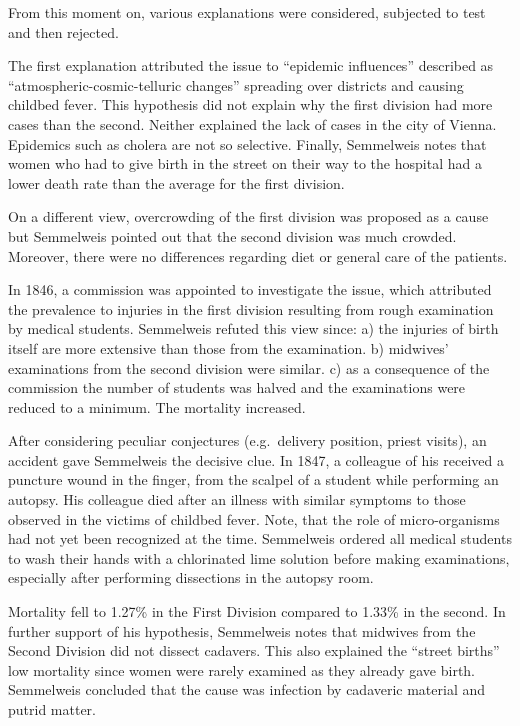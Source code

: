 \documentclass[
]{book}
\begin{document}
From this moment on, various explanations were considered, subjected to test and then rejected.

The first explanation attributed the issue to ``epidemic influences'' described as ``atmospheric-cosmic-telluric changes'' spreading over districts and causing childbed fever. This hypothesis did not explain why the first division had more cases than the second. Neither explained the lack of cases in the city of Vienna. Epidemics such as cholera are not so selective. Finally, Semmelweis notes that women who had to give birth in the street on their way to the hospital had a lower death rate than the average for the first division.

On a different view, overcrowding of the first division was proposed as a cause but Semmelweis pointed out that the second division was much crowded. Moreover, there were no differences regarding diet or general care of the patients.

In 1846, a commission was appointed to investigate the issue, which attributed the prevalence to injuries in the first division resulting from rough examination by medical students. Semmelweis refuted this view since: a) the injuries of birth itself are more extensive than those from the examination. b) midwives' examinations from the second division were similar. c) as a consequence of the commission the number of students was halved and the examinations were reduced to a minimum. The mortality increased.

After considering peculiar conjectures (e.g.~delivery position, priest visits), an accident gave Semmelweis the decisive clue. In 1847, a colleague of his received a puncture wound in the finger, from the scalpel of a student while performing an autopsy. His colleague died after an illness with similar symptoms to those observed in the victims of childbed fever. Note, that the role of micro-organisms had not yet been recognized at the time. Semmelweis ordered all medical students to wash their hands with a chlorinated lime solution before making examinations, especially after performing dissections in the autopsy room.

Mortality fell to 1.27\% in the First Division compared to 1.33\% in the second. In further support of his hypothesis, Semmelweis notes that midwives from the Second Division did not dissect cadavers. This also explained the ``street births'' low mortality since women were rarely examined as they already gave birth. Semmelweis concluded that the cause was infection by cadaveric material and putrid matter.
\end{document}
